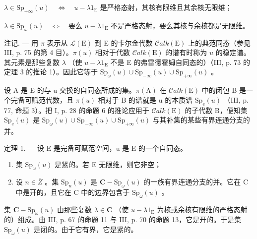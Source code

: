 \(\lambda \in \mathrm{Sp}_{+\infty}(u) \quad \Longleftrightarrow \quad u - \lambda 1_{\mathrm{E}}\) 是严格态射，其核有限维且其余核无限维；

\(\lambda \in \mathrm{Sp}_{\omega}(u) \quad \Longleftrightarrow \quad \text{要么 } u - \lambda 1_{\mathrm{E}} \text{ 不是严格态射，要么其核与余核都是无限维。}\)

注记. --- 用 \(\pi\) 表示从 \(\mathcal{L}(\mathrm{E})\) 到 E 的卡尔金代数 \(\mathcal{C}alk(\mathrm{E})\) 上的典范同态（参见 III, p. 75 的第 4 目）。\(\pi(u)\) 相对于代数 \(\mathcal{C}alk(\mathrm{E})\) 的谱有时称为 \(u\) 的稳定谱。其元素是那些复数 \(\lambda\) （使 \(u - \lambda 1_{\mathrm{E}}\) 不是 E 的弗雷德霍姆自同态的）（III, p. 73 的定理 3 的推论 1）。因此它等于 \(\mathrm{Sp}_{\omega}(u) \cup \mathrm{Sp}_{-\infty}(u) \cup \mathrm{Sp}_{+\infty}(u)\) 。

设 A 是 E 的与 u 交换的自同态所成的集。\(\pi(\mathrm{A})\) 在 \(\mathcal{C}alk(\mathrm{E})\) 中的闭包 B 是一个完备可赋范代数，且 \(\pi(u)\) 相对于 B 的谱就是 u 的本质谱 \(\mathrm{Sp}_{\mathrm{e}}(u)\) （III, p. 77, 命题 3）。把 I, p. 28 的命题 6 的推论应用于 \(\mathcal{C}alk(\mathrm{E})\) 的子代数 B，便知集 \(\mathrm{Sp}_{\mathrm{e}}(u)\) 是 \(\mathrm{Sp}_{\omega}(u) \cup \mathrm{Sp}_{-\infty}(u) \cup \mathrm{Sp}_{+\infty}(u)\) 与其补集的某些有界连通分支的并。

定理 1. --- 设 E 是完备可赋范空间，u 是 E 的一个自同态。

\begin{enumerate}
\def\labelenumi{\alph{enumi})}
\item
  集 \(\mathrm{Sp}_{\omega}(u)\) 是紧的。若 E 无限维，则它非空；
\item
  设 \(n \in \overline{Z}\) 。集 \(\mathrm{Sp}_{n}(u)\) 是 \(\mathbf{C} - \mathrm{Sp}_{\omega}(u)\) 的一族有界连通分支的并。它在 C 中是开的，且它在 C 中的边界包含于 \(\mathrm{Sp}_{\omega}(u)\) 。
\end{enumerate}

集 \(\mathbf{C} - \mathrm{Sp}_{\omega}(u)\) 由那些复数 \(\lambda \in \mathbf{C}\) （使 \(u - \lambda 1_{\mathrm{E}}\) 为核或余核有限维的严格态射的）组成。由 III, p. 67 的命题 11 与 III, p. 70 的命题 13，它是开的。于是集 \(\mathrm{Sp}_{\omega}(u)\) 是闭的。由于它有界，它是紧的。

